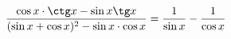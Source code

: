 \begin{ex}[type=prove_identity]
	\begin{condition}
		\( \dfrac{\cos x\cdot\ctg x - \sin x \tg x}{(\sin x + \cos x)^2-\sin x\cdot\cos x} = \dfrac{1}{\sin x}-\dfrac{1}{\cos x} \)
	\end{condition}
\end{ex}